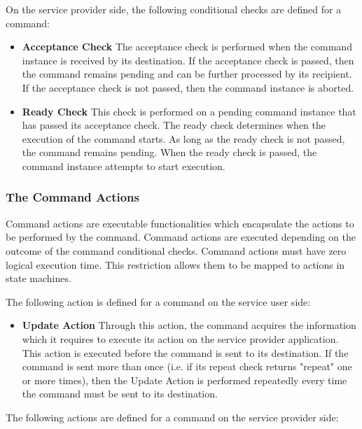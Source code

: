 On the service provider side, the following conditional checks are defined for a command:

\begin{itemize}
\item \textbf{Acceptance Check}
The acceptance check is performed when the command instance is received by its destination. If the acceptance check is passed, then the command remains pending and can be further processed by its recipient. If the acceptance check is not passed, then the command instance is aborted.

\item \textbf{Ready Check}
This check is performed on a pending command instance that has passed its acceptance check. The ready check determines when the execution of the command starts.  As long as the ready check is not passed, the command remains pending. When the ready check is passed, the command instance attempts to start execution.
\end{itemize}

\subsubsection{The Command Actions}\label{sec:CmdActions}
Command actions are executable functionalities which encapsulate the actions to be performed by the command. Command actions are executed depending on the outcome of the command conditional checks. Command actions must have zero logical execution time. This restriction allows them to be mapped to actions in state machines. 

The following action is defined for a command on the service user side:

\begin{itemize}
\item \textbf{Update Action}
Through this action, the command acquires the information which it requires to execute its action on the service provider application. This action is executed before the command is sent to its destination. If the command is sent more than once (i.e. if its repeat check returns "repeat" one or more times), then the Update Action is performed repeatedly every time the command must be sent to its destination.
\end{itemize} 

The following actions are defined for a command on the service provider side:


